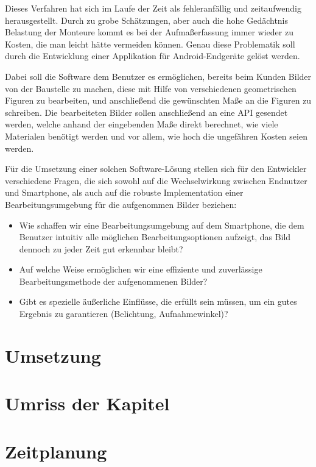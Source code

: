 \documentclass[a4paper]{article}
\begin{document}
Dieses Verfahren hat sich im Laufe der Zeit als fehleranfällig und zeitaufwendig herausgestellt.
Durch zu grobe Schätzungen, aber auch die hohe Gedächtnis Belastung der Monteure kommt es bei der Aufmaßerfassung immer wieder zu Kosten, die man leicht hätte vermeiden können.
Genau diese Problematik soll durch die Entwicklung einer Applikation für Android-Endgeräte gelöst werden. 

Dabei soll die Software dem Benutzer es ermöglichen, bereits beim Kunden Bilder von der Baustelle zu machen, diese mit Hilfe von verschiedenen geometrischen Figuren zu bearbeiten, und anschließend die gewünschten Maße an die Figuren zu schreiben. 
Die bearbeiteten Bilder sollen anschließend an eine API gesendet werden, welche anhand der eingebenden Maße direkt berechnet, wie viele Materialen benötigt werden und vor allem, wie hoch die ungefähren Kosten seien werden.

Für die Umsetzung einer solchen Software-Lösung stellen sich für den Entwickler verschiedene Fragen, die sich sowohl auf die Wechselwirkung zwischen Endnutzer und Smartphone, als auch auf die robuste Implementation einer Bearbeitungsumgebung für die aufgenommen Bilder beziehen: 
\\
\begin{itemize}
	\item Wie schaffen wir eine Bearbeitungsumgebung auf dem Smartphone, die dem Benutzer intuitiv alle möglichen Bearbeitungsoptionen aufzeigt, das Bild dennoch zu jeder Zeit gut erkennbar bleibt?
	\item Auf welche Weise ermöglichen wir eine effiziente und zuverlässige Bearbeitungsmethode der aufgenommenen Bilder?
	\item Gibt es spezielle äußerliche Einflüsse, die erfüllt sein müssen, um ein gutes Ergebnis zu garantieren (Belichtung, Aufnahmewinkel)?
\end{itemize}
\newpage

\section{Umsetzung}
\lipsum[1-2]

\section{Umriss der Kapitel}
\lipsum[1]

\section{Zeitplanung}
\lipsum[1-3]
\end{document}
